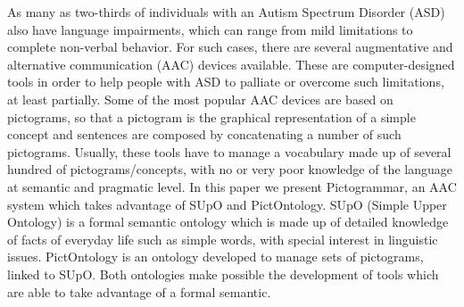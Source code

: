 As many as two-thirds of individuals with an Autism Spectrum Disorder (ASD) also have language impairments, which can range from mild limitations to complete non-verbal behavior. For such cases, there are several augmentative and alternative communication (AAC) devices available. These are computer-designed tools in order to help people with ASD to palliate or overcome such limitations, at least partially. Some of the most popular AAC devices are based on pictograms, so that a pictogram is the graphical representation of a simple concept and sentences are composed by concatenating a number of such pictograms. Usually, these tools have to manage a vocabulary made up of several hundred of pictograms/concepts, with no or very poor knowledge of the language at semantic and pragmatic level. In this paper we present Pictogrammar, an AAC system which takes advantage of SUpO and PictOntology. SUpO (Simple Upper Ontology) is a formal semantic ontology which is made up of detailed knowledge of facts of everyday life such as simple words, with special interest in linguistic issues. PictOntology is an ontology developed to manage sets of pictograms, linked to SUpO. Both ontologies make possible the development of tools which are able to take advantage of a formal semantic.
